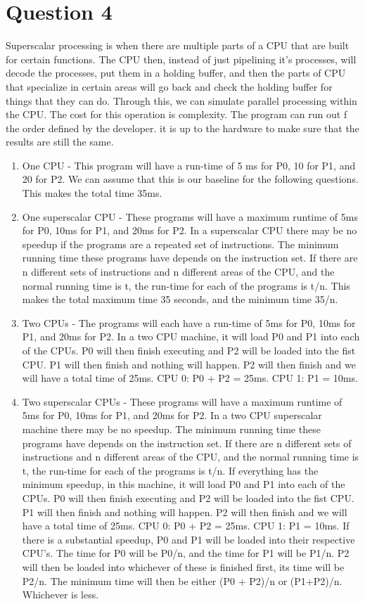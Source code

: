 \documentclass[12pt]{extarticle}
\begin{document}
	\section*{Question 4}
		Superscalar processing is when there are multiple parts of a CPU that are built for certain functions.  The CPU then, instead of just pipelining it's processes, will decode the processes, put them in a holding buffer, and then the parts of CPU that specialize in certain areas will go back and check the holding buffer for things that they can do.  Through this, we can simulate parallel processing within the CPU.  The cost for this operation is complexity.  The program can run out f the order defined by the developer.  it is up to the hardware to make sure that the results are still the same.
		\begin{enumerate}
			\item One CPU - This program will have a run-time of 5 ms for P0, 10 for P1, and 20 for P2.  We can assume that this is our baseline for the following questions.  This makes the total time 35ms.
			\item One superscalar CPU - These programs will have a maximum runtime of 5ms for P0, 10ms for P1, and 20ms for P2.  In a superscalar CPU there may be no speedup if the programs are a repeated set of instructions.  The minimum running time these programs have depends on the instruction set.  If there are n different sets of instructions and n different areas of the CPU, and the normal running time is t, the run-time for each of the programs is t/n.  This makes the total maximum time 35 seconds, and the minimum time 35/n.
			\item Two CPUs - The programs will each have a run-time of 5ms for P0, 10ms for P1, and 20ms for P2.  In a two CPU machine, it will load P0 and P1 into each of the CPUs.  P0 will then finish executing and P2 will be loaded into the fist CPU.  P1 will then finish and nothing will happen.  P2 will then finish and we will have a total time of 25ms.  CPU 0: P0 + P2 = 25ms.  CPU 1: P1 = 10ms.
			\item Two superscalar CPUs - These programs will have a maximum runtime of 5ms for P0, 10ms for P1, and 20ms for P2.  In a two CPU superscalar machine there may be no speedup.  The minimum running time these programs have depends on the instruction set.  If there are n different sets of instructions and n different areas of the CPU, and the normal running time is t, the run-time for each of the programs is t/n.  If everything has the minimum speedup, in this machine, it will load P0 and P1 into each of the CPUs.  P0 will then finish executing and P2 will be loaded into the fist CPU.  P1 will then finish and nothing will happen.  P2 will then finish and we will have a total time of 25ms.  CPU 0: P0 + P2 = 25ms.  CPU 1: P1 = 10ms.  If there is a substantial speedup, P0 and P1 will be loaded into their respective CPU's.  The time for P0 will be P0/n, and the time for P1 will be P1/n.  P2 will then be loaded into whichever of these is finished first, its time will be P2/n.  The minimum time will then be either (P0 + P2)/n or (P1+P2)/n.  Whichever is less.
		\end{enumerate}
\end{document}
